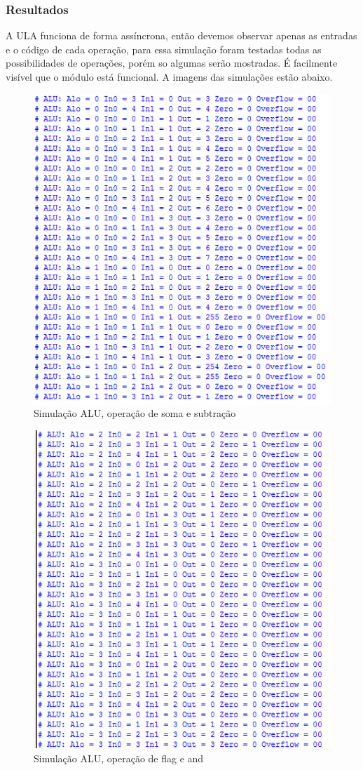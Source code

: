\documentclass[a4paper, 10pt]{article}
\begin{document}
\subsubsection{Resultados}
A ULA funciona de forma assíncrona, então devemos observar apenas as entradas e o código de cada operação, para essa simulação foram testadas todas as possibilidades de operações, porém so algumas serão mostradas. É facilmente visível que o módulo está funcional. A imagens das simulações estão abaixo.
\begin{figure}[H]
	\centering
	\includegraphics[scale=0.7]{sumuALU(add-sub).PNG}
	\caption{Simulação ALU, operação de soma e subtração}
	\label{Rotulo}
\end{figure}

\begin{figure}[H]
	\centering
	\includegraphics[scale=0.7]{sumuALU(flag-and).PNG}
	\caption{Simulação ALU, operação de flag e and}
	\label{Rotulo}
\end{figure}
\end{document}
